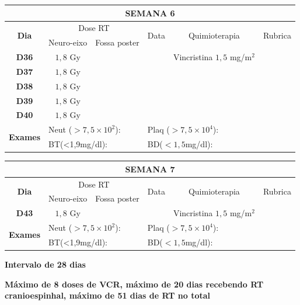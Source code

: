 \documentclass[11pt,a4paper,oldfontcommands]{memoir}
\begin{document}
\begin{center}
\begin{longtable}{p{1cm}p{2cm}|p{2cm}|p{1cm}|p{4cm}|p{3cm}}
	\hline
	\multicolumn{6}{c}{\textbf{SEMANA 6}}\\
\hline
    \multicolumn{1}{c|}{\multirow{2}{*}{\textbf{Dia}}}&\multicolumn{2}{c|}{Dose RT}&\multicolumn{1}{c|}{\multirow{2}{*}{Data}}&\multicolumn{1}{c|}{\multirow{2}{*}{Quimioterapia}}&\multicolumn{1}{c}{\multirow{2}{*}{Rubrica}} \\
    \cline{2-3}
    \multicolumn{1}{c|}{\multirow{1}{*}{}}&{Neuro-eixo}&{Fossa poster}&& \\
	\hline
	\multicolumn{1}{c|}{\multirow{1}{*}{\textbf{D36}}}&\multicolumn{1}{c|}{\(1,8\) Gy}&&&{Vincristina \(1,5\) mg/m\(^2\)}&\\
    \multicolumn{1}{c|}{\multirow{1}{*}{\textbf{D37}}}&\multicolumn{1}{c|}{\(1,8\) Gy}&&&{}&\\
    \multicolumn{1}{c|}{\multirow{1}{*}{\textbf{D38}}}&\multicolumn{1}{c|}{\(1,8\) Gy}&&&{}&\\
    \multicolumn{1}{c|}{\multirow{1}{*}{\textbf{D39}}}&\multicolumn{1}{c|}{\(1,8\) Gy}&&&{}&\\
    \multicolumn{1}{c|}{\multirow{1}{*}{\textbf{D40}}}&\multicolumn{1}{c|}{\(1,8\) Gy}&&&{}&\\
    \hline
    \multicolumn{1}{c|}{\multirow{2}{*}{\textbf{Exames}}}&\multicolumn{2}{l|}{Neut (\(>7,5\times10^2\)):}&\multicolumn{2}{l|}{Plaq (\(>7,5\times10^4\)):}&\\
    \cline{2-6}
    \multicolumn{1}{c|}{\multirow{2}{*}{{}}}&\multicolumn{2}{l|}{BT(<1,9mg/dl):}&\multicolumn{2}{l|}{BD(\(<1,5\)mg/dl):}&
    \\
    \hline
\end{longtable}
\begin{longtable}{p{1cm}p{2cm}|p{2cm}|p{1cm}|p{4cm}|p{3cm}}
	\hline
	\multicolumn{6}{c}{\textbf{SEMANA 7}}\\
\hline
    \multicolumn{1}{c|}{\multirow{2}{*}{\textbf{Dia}}}&\multicolumn{2}{c|}{Dose RT}&\multicolumn{1}{c|}{\multirow{2}{*}{Data}}&\multicolumn{1}{c|}{\multirow{2}{*}{Quimioterapia}}&\multicolumn{1}{c}{\multirow{2}{*}{Rubrica}} \\
    \cline{2-3}
    \multicolumn{1}{c|}{\multirow{1}{*}{}}&{Neuro-eixo}&{Fossa poster}&& \\
	\hline
	\multicolumn{1}{c|}{\multirow{1}{*}{\textbf{D43}}}&\multicolumn{1}{c|}{\(1,8\) Gy}&&&{Vincristina \(1,5\) mg/m\(^2\)}&\\
    \hline
    \multicolumn{1}{c|}{\multirow{2}{*}{\textbf{Exames}}}&\multicolumn{2}{l|}{Neut (\(>7,5\times10^2\)):}&\multicolumn{2}{l|}{Plaq (\(>7,5\times10^4\)):}&\\
    \cline{2-6}
    \multicolumn{1}{c|}{\multirow{2}{*}{{}}}&\multicolumn{2}{l|}{BT(<1,9mg/dl):}&\multicolumn{2}{l|}{BD(\(<1,5\)mg/dl):}&
    \\
    \hline
\end{longtable}
\textbf{Intervalo de 28 dias}\\
\end{center}
\textbf{Máximo de 8 doses de VCR, máximo de 20 dias recebendo RT cranioespinhal, máximo de 51 dias de RT no total}
\clearpage
\end{document}
